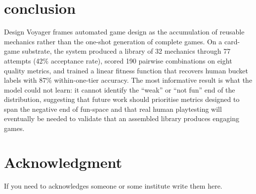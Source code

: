 \documentclass[conference]{IEEEtran}
\begin{document}
\section{conclusion}
Design Voyager frames automated game design as the accumulation of reusable mechanics rather than the one-shot generation of complete games. On a card-game substrate, the system produced a library of 32 mechanics through 77 attempts (42\% acceptance rate), scored 190 pairwise combinations on eight quality metrics, and trained a linear fitness function that recovers human bucket labels with 87\% within-one-tier accuracy. The most informative result is what the model could not learn: it cannot identify the ``weak'' or ``not fun'' end of the distribution, suggesting that future work should prioritise metrics designed to span the negative end of fun-space and that real human playtesting will eventually be needed to validate that an assembled library produces engaging games.

\section*{Acknowledgment}

If you need to acknowledges someone or some institute write them here.




\end{document}
